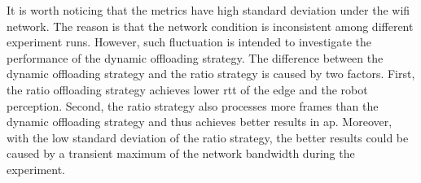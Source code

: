 It is worth noticing that the metrics have high standard deviation under the \gls{wifi} network. The reason is that the network condition is inconsistent among different experiment runs. However, such fluctuation is intended to investigate the performance of the dynamic offloading strategy. The difference between the dynamic offloading strategy and the ratio strategy is caused by two factors. First, the ratio offloading strategy achieves lower \gls{rtt} of the edge and the robot perception. Second, the ratio strategy also processes more frames than the dynamic offloading strategy and thus achieves better results in \gls{ap}. Moreover, with the low standard deviation of the ratio strategy, the better results could be caused by a transient maximum of the network bandwidth during the experiment. 

